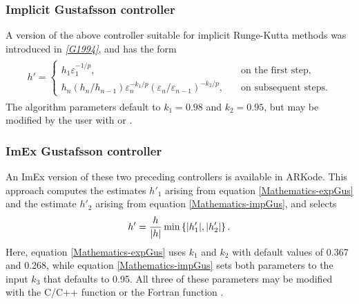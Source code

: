 \documentclass[letterpaper,10pt,english]{sphinxmanual}
\begin{document}
\subsubsection{Implicit Gustafsson controller}
\label{Mathematics:mathematics-adaptivity-errorcontrol-igus}\label{Mathematics:implicit-gustafsson-controller}
A version of the above controller suitable for implicit Runge-Kutta
methods was introduced in \label{Mathematics:id17}{\hyperref[References:g1994]{\emph{{[}G1994{]}}}}, and has the form
\label{Mathematics:equation-impGus}\begin{gather}
\begin{split}h' = \begin{cases}
   h_1 \varepsilon_1^{-1/p}, &\quad\text{on the first step}, \\
   h_n \left(h_n / h_{n-1}\right) \varepsilon_n^{-k_1/p}
     \left(\varepsilon_n/\varepsilon_{n-1}\right)^{-k_2/p}, &
   \quad\text{on subsequent steps}.
\end{cases}\end{split}\label{Mathematics-impGus}
\end{gather}
The algorithm parameters default to \(k_1 = 0.98\) and
\(k_2 = 0.95\), but may be modified by the user with
{\hyperref[c_interface/User_callable:c.ARKodeSetAdaptivityMethod]{\emph{}}} or {\hyperref[f_interface/Usage:f/_/FARKSETADAPTIVITYMETHOD]{\emph{}}}.


\subsubsection{ImEx Gustafsson controller}
\label{Mathematics:imex-gustafsson-controller}\label{Mathematics:mathematics-adaptivity-errorcontrol-iegus}
An ImEx version of these two preceding controllers is available in
ARKode.  This approach computes the estimates \(h'_1\) arising from
equation \eqref{Mathematics-expGus} and the estimate \(h'_2\) arising from
equation \eqref{Mathematics-impGus}, and selects
\begin{gather}
\begin{split}h' = \frac{h}{|h|}\min\left\{|h'_1|, |h'_2|\right\}.\end{split}\notag
\end{gather}
Here, equation \eqref{Mathematics-expGus} uses \(k_1\) and
\(k_2\) with default values of 0.367 and 0.268, while equation
\eqref{Mathematics-impGus} sets both parameters to the input \(k_3\) that
defaults to 0.95.  All three of these parameters may be modified with
the C/C++ function {\hyperref[c_interface/User_callable:c.ARKodeSetAdaptivityMethod]{\emph{}}} or the
Fortran function {\hyperref[f_interface/Usage:f/_/FARKSETADAPTIVITYMETHOD]{\emph{}}}.
\end{document}
